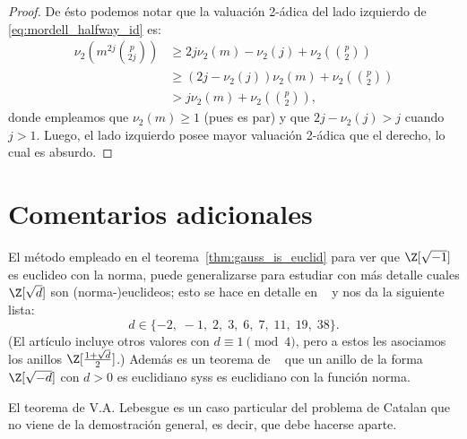 \documentclass[11pt, reqno]{amsart}
\begin{document}
\begin{proof}
	De ésto podemos notar que la valuación 2-ádica del lado izquierdo de \eqref{eq:mordell_halfway_id} es:
	\begin{align*}
		\nu_2\left( m^{2j} \binom{p}{2j} \right) &\ge 2j \nu_2(m) - \nu_2(j) + \nu_2\left( \binom{p}{2} \right) \\
							 &\ge (2j - \nu_2(j)) \nu_2(m) + \nu_2\left( \binom{p}{2} \right) \\
							 &> j \nu_2(m) + \nu_2\left( \binom{p}{2} \right),
	\end{align*}
	donde empleamos que $\nu_2(m) \ge 1$ (pues es par) y que $2j - \nu_2(j) > j$ cuando $j > 1$.
	Luego, el lado izquierdo posee mayor valuación 2-ádica que el derecho, lo cual es absurdo.
\end{proof}

\section{Comentarios adicionales}
El método empleado en el teorema~\ref{thm:gauss_is_euclid} para ver que $\Z[\sqrt{-1}]$ es euclideo con la norma,
puede generalizarse para estudiar con más detalle cuales $\Z[\sqrt{d}]$ son (norma-)euclideos;
esto se hace en detalle en \citeauthor{eggleton:euclidean}~\cite{eggleton:euclidean} y nos da la siguiente lista:
$$ d \in \{ -2, \; -1, \; 2, \; 3, \; 6, \; 7, \; 11, \; 19, \; 38 \}. $$
(El artículo incluye otros valores con $d \equiv 1 \pmod 4$, pero a estos les asociamos los anillos $\Z[\frac{1 + \sqrt{d}}{2}]$.)
Además es un teorema de \citeauthor{motzkin:euclidean}~\cite{motzkin:euclidean} que un anillo de la forma $\Z[\sqrt{-d}]$ con $d > 0$
es euclidiano syss es euclidiano con la función norma.

El teorema de V.A. Lebesgue es un caso particular del problema de Catalan que no viene de la demostración general, es decir, que debe hacerse aparte.

\nocite{mordell:diophantine}
\printbibliography[title={Referencias y lecturas adicionales}]
\end{document}
